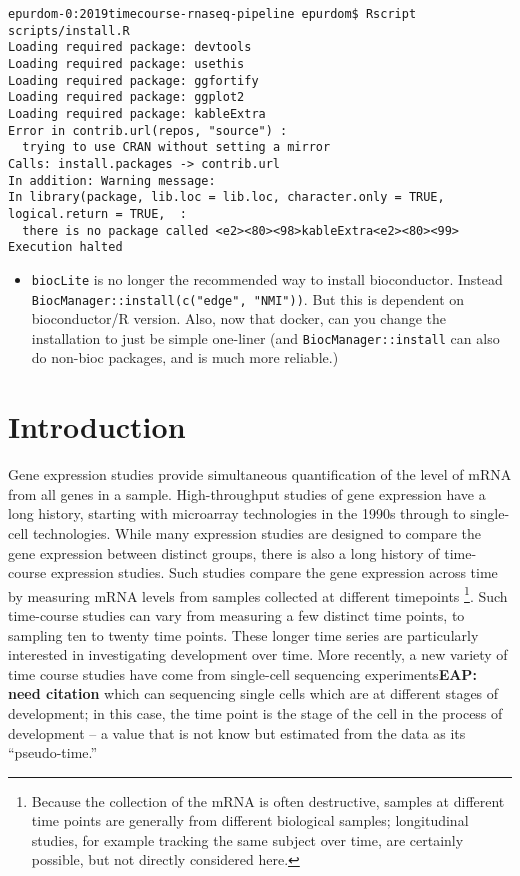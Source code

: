 \documentclass[9pt,a4paper,]{extarticle}
\begin{document}
\begin{verbatim}
epurdom-0:2019timecourse-rnaseq-pipeline epurdom$ Rscript scripts/install.R
Loading required package: devtools
Loading required package: usethis
Loading required package: ggfortify
Loading required package: ggplot2
Loading required package: kableExtra
Error in contrib.url(repos, "source") : 
  trying to use CRAN without setting a mirror
Calls: install.packages -> contrib.url
In addition: Warning message:
In library(package, lib.loc = lib.loc, character.only = TRUE, logical.return = TRUE,  :
  there is no package called <e2><80><98>kableExtra<e2><80><99>
Execution halted
\end{verbatim}

\begin{itemize}
\tightlist
\item
  \texttt{biocLite} is no longer the recommended way to install bioconductor. Instead
  \texttt{BiocManager::install(c("edge",\ "NMI"))}. But this is dependent on
  bioconductor/R version. Also, now that docker, can you change the
  installation to just be simple one-liner (and \texttt{BiocManager::install} can
  also do non-bioc packages, and is much more reliable.)
\end{itemize}

\hypertarget{introduction}{%
\section{Introduction}\label{introduction}}

Gene expression studies provide simultaneous quantification of the level of
mRNA from all genes in a sample. High-throughput studies of gene expression
have a long history, starting with microarray technologies in the 1990s
through to single-cell technologies. While many expression studies are
designed to compare the gene expression between distinct groups, there is also a
long history of time-course expression studies. Such studies compare the gene expression
across time by measuring mRNA levels from samples collected at different timepoints \footnote{Because the collection of the mRNA is often destructive, samples at
  different time points are generally from different biological samples;
  longitudinal studies, for example tracking the same subject over time, are
  certainly possible, but not directly considered here.}. Such time-course studies can vary from measuring a few distinct time
points, to sampling ten to twenty time points. These longer time series are
particularly interested in investigating development over time. More recently,
a new variety of time course studies have come from single-cell sequencing experiments\textbf{EAP: need citation} which can sequencing single cells which are at different stages of development; in this case, the time point is the stage of the cell in the process of development -- a
value that is not know but estimated from the data as its ``pseudo-time.''
\end{document}

